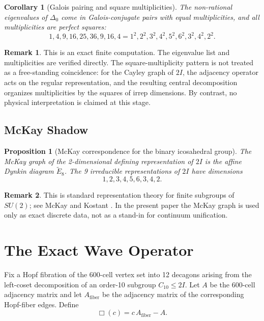 \documentclass[12pt,a4paper]{article}
\newtheorem{proposition}{Proposition}
\newtheorem{corollary}{Corollary}
\theoremstyle{definition}
\newtheorem{remark}{Remark}
\begin{document}
\begin{corollary}[Galois pairing and square multiplicities]
The non-rational eigenvalues of $\Delta_0$ come in Galois-conjugate pairs with
equal multiplicities, and all multiplicities are perfect squares:
\[
1,4,9,16,25,36,9,16,4 = 1^2,2^2,3^2,4^2,5^2,6^2,3^2,4^2,2^2.
\]
\end{corollary}

\begin{remark}
This is an exact finite computation.  The eigenvalue list and multiplicities
are verified directly.  The square-multiplicity pattern is not treated as a
free-standing coincidence: for the Cayley graph of $2I$, the adjacency operator
acts on the regular representation, and the resulting central decomposition
organizes multiplicities by the squares of irrep dimensions.  By contrast, no
physical interpretation is claimed at this stage.
\end{remark}

\subsection{McKay Shadow}

\begin{proposition}[McKay correspondence for the binary icosahedral group]
\label{prop:mckay_exact}
The McKay graph of the 2-dimensional defining representation of $2I$ is the affine Dynkin diagram $\widetilde{E}_8$.  The 9 irreducible representations of $2I$ have dimensions
\begin{equation}
1,2,3,4,5,6,3,4,2.
\end{equation}
\end{proposition}

\begin{remark}
This is standard representation theory for finite subgroups of $SU(2)$; see McKay and Kostant \cite{mckay1980,kostant1984}.  In the present paper the McKay graph is used only as exact discrete data, not as a stand-in for continuum unification.
\end{remark}

\section{The Exact Wave Operator}

Fix a Hopf fibration of the 600-cell vertex set into 12 decagons arising from the left-coset decomposition of an order-10 subgroup $C_{10}\le 2I$.  Let $A$ be the 600-cell adjacency matrix and let $A_{\mathrm{fiber}}$ be the adjacency matrix of the corresponding Hopf-fiber edges.  Define
\begin{equation}
\Box(c)=c\,A_{\mathrm{fiber}}-A.
\end{equation}
\end{document}
